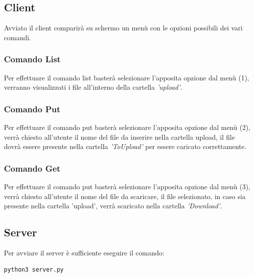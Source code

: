 \documentclass{article}
\begin{document}
\subsection{Client}
Avviato il client comparirà su schermo un menù con le opzioni possibili dei vari comandi.
\subsubsection{Comando List}Per effettuare il comando list basterà selezionare l'apposita opzione dal menù (1), verranno visualizzati i file all'interno della cartella \textit{'upload'}.
\subsubsection{Comando Put}Per effettuare il comando put basterà selezionare l'apposita opzione dal menù (2), verrà chiesto all'utente il nome del file da inserire nella cartella upload, il file dovrà essere presente nella cartella \textit{'ToUpload'} per essere caricato correttamente.
\subsubsection{Comando Get}Per effettuare il comando put basterà selezionare l'apposita opzione dal menù (3), verrà chiesto all'utente il nome del file da scaricare, il file selezionato, in caso sia presente nella cartella 'upload', verrà scaricato nella cartella \textit{'Download'}.
\subsection{Server}


Per avviare il server è sufficiente eseguire il comando:

\begin{verbatim}
python3 server.py
\end{verbatim}
\end{document}

